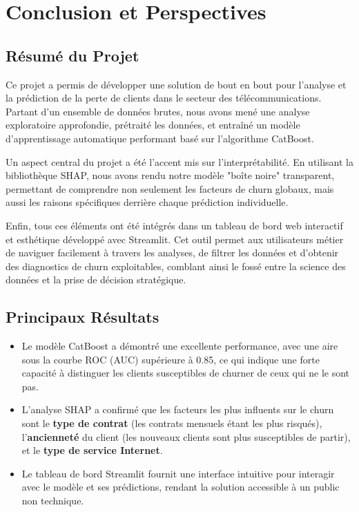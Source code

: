 \chapter{Conclusion et Perspectives}

\section{Résumé du Projet}
Ce projet a permis de développer une solution de bout en bout pour l'analyse et la prédiction de la perte de clients dans le secteur des télécommunications. Partant d'un ensemble de données brutes, nous avons mené une analyse exploratoire approfondie, prétraité les données, et entraîné un modèle d'apprentissage automatique performant basé sur l'algorithme CatBoost.

Un aspect central du projet a été l'accent mis sur l'interprétabilité. En utilisant la bibliothèque SHAP, nous avons rendu notre modèle "boîte noire" transparent, permettant de comprendre non seulement les facteurs de churn globaux, mais aussi les raisons spécifiques derrière chaque prédiction individuelle.

Enfin, tous ces éléments ont été intégrés dans un tableau de bord web interactif et esthétique développé avec Streamlit. Cet outil permet aux utilisateurs métier de naviguer facilement à travers les analyses, de filtrer les données et d'obtenir des diagnostics de churn exploitables, comblant ainsi le fossé entre la science des données et la prise de décision stratégique.

\section{Principaux Résultats}
\begin{itemize}
    \item Le modèle CatBoost a démontré une excellente performance, avec une aire sous la courbe ROC (AUC) supérieure à 0.85, ce qui indique une forte capacité à distinguer les clients susceptibles de churner de ceux qui ne le sont pas.
    \item L'analyse SHAP a confirmé que les facteurs les plus influents sur le churn sont le \textbf{type de contrat} (les contrats mensuels étant les plus risqués), l'\textbf{ancienneté} du client (les nouveaux clients sont plus susceptibles de partir), et le \textbf{type de service Internet}.
    \item Le tableau de bord Streamlit fournit une interface intuitive pour interagir avec le modèle et ses prédictions, rendant la solution accessible à un public non technique.
\end{itemize}

